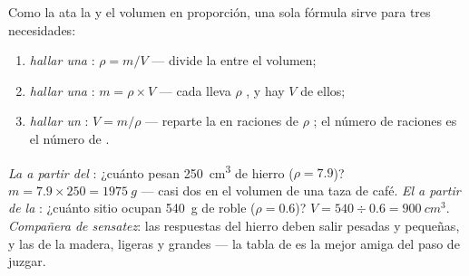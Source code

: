 \begin{proposition}\label{prop:g7:volume-mass-density:recipes}
Como la  ata la  y el volumen en proporción,
una sola fórmula sirve para tres necesidades:
\begin{enumerate}
  \item \emph{hallar una }: $\rho = m/V$ --- divide la
         entre el volumen;
  \item \emph{hallar una }: $m = \rho \times V$ --- cada
         lleva $\rho$ , y hay $V$ de
        ellos;
  \item \emph{hallar un }: $V = m/\rho$ --- reparte la
         en raciones de $\rho$ ; el número de
        raciones es el número de .
\end{enumerate}
\end{proposition}

\begin{example}\label{ex:g7:volume-mass-density:atwork}
\emph{La  a partir del }: ¿cuánto pesan
\qty{250}{cm^3} de hierro ($\rho = 7.9$)?
$m = 7.9 \times 250 = \qty{1975}{g}$ --- casi dos  en el
volumen de una taza de café.
\emph{El  a partir de la }: ¿cuánto sitio ocupan
\qty{540}{g} de roble ($\rho = 0.6$)?
$V = 540 \div 0.6 = \qty{900}{cm^3}$.
\emph{Compañera de sensatez}: las respuestas del hierro deben salir
pesadas y pequeñas, y las de la madera, ligeras y grandes --- la tabla
de  es la mejor amiga del paso de juzgar.
\end{example}

